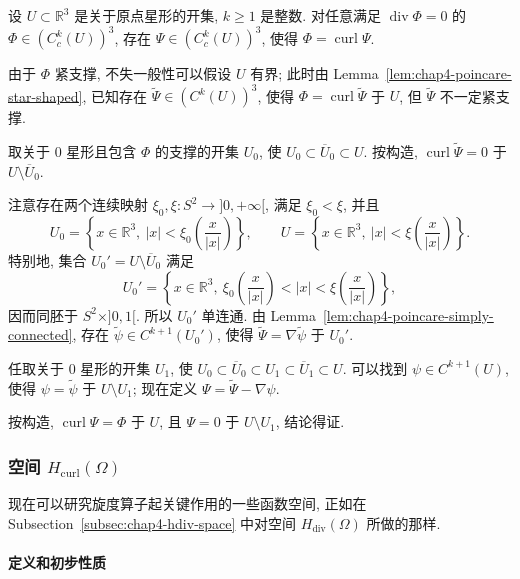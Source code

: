 \begin{Lemma}
\label{lem:chap4-poincare-compact-vector-potential}
设 $U\subset\mathbb R^3$ 是关于原点星形的开集, $k\geq1$ 是整数. 对任意满足 $\operatorname{div}\Phi=0$ 的 $\Phi\in(C_c^k(U))^3$, 存在 $\Psi\in(C_c^k(U))^3$, 使得 $\Phi=\operatorname{curl}\Psi$.
\end{Lemma}

\begin{Proof}
由于 $\Phi$ 紧支撑, 不失一般性可以假设 $U$ 有界; 此时由 Lemma~\ref{lem:chap4-poincare-star-shaped}, 已知存在 $\widetilde\Psi\in(C^k(U))^3$, 使得 $\Phi=\operatorname{curl}\widetilde\Psi$ 于 $U$, 但 $\widetilde\Psi$ 不一定紧支撑.

取关于 $0$ 星形且包含 $\Phi$ 的支撑的开集 $U_0$, 使 $U_0\subset\overline U_0\subset U$. 按构造, $\operatorname{curl}\widetilde\Psi=0$ 于 $U\setminus\overline U_0$.

注意存在两个连续映射 $\xi_0,\xi:S^2\to]0,+\infty[$, 满足 $\xi_0<\xi$, 并且
\[
 U_0=\left\{x\in\mathbb R^3,\ |x|<\xi_0\left(\frac{x}{|x|}\right)\right\},
 \qquad
 U=\left\{x\in\mathbb R^3,\ |x|<\xi\left(\frac{x}{|x|}\right)\right\}.
\]
特别地, 集合 $U_0'=U\setminus\overline U_0$ 满足
\[
 U_0'=\left\{x\in\mathbb R^3,
 \ \xi_0\left(\frac{x}{|x|}\right)<|x|<
 \xi\left(\frac{x}{|x|}\right)\right\},
\]
因而同胚于 $S^2\times]0,1[$. 所以 $U_0'$ 单连通. 由 Lemma~\ref{lem:chap4-poincare-simply-connected}, 存在 $\widetilde\psi\in C^{k+1}(U_0')$, 使得 $\widetilde\Psi=\nabla\widetilde\psi$ 于 $U_0'$.

任取关于 $0$ 星形的开集 $U_1$, 使 $U_0\subset\overline U_0\subset U_1\subset\overline U_1\subset U$. 可以找到 $\psi\in C^{k+1}(U)$, 使得 $\psi=\widetilde\psi$ 于 $U\setminus U_1$; 现在定义 $\Psi=\widetilde\Psi-\nabla\psi$.

按构造, $\operatorname{curl}\Psi=\Phi$ 于 $U$, 且 $\Psi=0$ 于 $U\setminus U_1$, 结论得证.
\end{Proof}
\subsubsection{空间 $H_{\operatorname{curl}}(\Omega)$}
\label{subsec:chap4-hcurl-space}

现在可以研究旋度算子起关键作用的一些函数空间, 正如在 Subsection~\ref{subsec:chap4-hdiv-space} 中对空间 $H_{\operatorname{div}}(\Omega)$ 所做的那样.

\paragraph{定义和初步性质}

